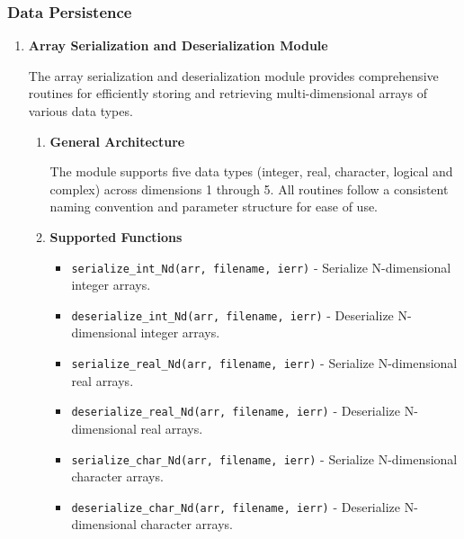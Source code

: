\documentclass[11pt]{article}
\begin{document}
\subsubsection{Data Persistence}
\begin{enumerate}
	\item \textbf{Array Serialization and Deserialization Module}
	      
	      The array serialization and deserialization module provides comprehensive routines
	      for efficiently storing and retrieving multi-dimensional arrays of various
	      data types.
	      
	      \begin{enumerate}
	      	\item \textbf{General Architecture}
	      	      
	      	      The module supports five data types (integer, real, character, logical
	      	      and complex) across dimensions 1 through 5. All routines follow a
	      	      consistent naming convention and parameter structure for ease of use.
	      	      
	      	\item \textbf{Supported Functions}
	      	      
	      	      \begin{itemize}
	      	      	\item \texttt{serialize\_int\_Nd(arr, filename, ierr)} - Serialize N-dimensional
	      	      	      integer arrays.
	      	      	      
	      	      	\item \texttt{deserialize\_int\_Nd(arr, filename, ierr)} -
	      	      	      Deserialize N-dimensional integer arrays.
	      	      	      
	      	      	\item \texttt{serialize\_real\_Nd(arr, filename, ierr)} - Serialize
	      	      	      N-dimensional real arrays.
	      	      	      
	      	      	\item \texttt{deserialize\_real\_Nd(arr, filename, ierr)} -
	      	      	      Deserialize N-dimensional real arrays.
	      	      	      
	      	      	\item \texttt{serialize\_char\_Nd(arr, filename, ierr)} - Serialize
	      	      	      N-dimensional character arrays.
	      	      	      
	      	      	\item \texttt{deserialize\_char\_Nd(arr, filename, ierr)} -
	      	      	      Deserialize N-dimensional character arrays.
	      	      	      

\end{itemize}
\end{enumerate}
\end{enumerate}
\end{document}
